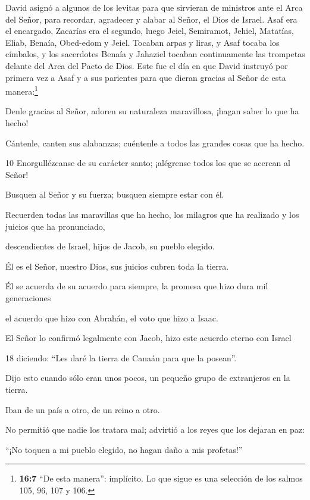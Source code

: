  David asignó a algunos de los levitas para que sirvieran de
ministros ante el Arca del Señor, para recordar, agradecer y alabar al
Señor, el Dios de Israel.  Asaf era el encargado, Zacarías
era el segundo, luego Jeiel, Semiramot, Jehiel, Matatías, Eliab, Benaía,
Obed-edom y Jeiel. Tocaban arpas y liras, y Asaf tocaba los címbalos,
 y los sacerdotes Benaía y Jahaziel tocaban continuamente
las trompetas delante del Arca del Pacto de Dios.  Este fue
el día en que David instruyó por primera vez a Asaf y a sus parientes
para que dieran gracias al Señor de esta manera:\footnote{\textbf{16:7}
  ``De esta manera'': implícito. Lo que sigue es una selección de los
  salmos 105, 96, 107 y 106.}

 Denle gracias al Señor, adoren su naturaleza maravillosa,
¡hagan saber lo que ha hecho!

 Cántenle, canten sus alabanzas; cuéntenle a todos las
grandes cosas que ha hecho.

10 Enorgullézcanse de su carácter santo; ¡alégrense todos los que se
acercan al Señor!

 Busquen al Señor y su fuerza; busquen siempre estar con
él.

 Recuerden todas las maravillas que ha hecho, los milagros
que ha realizado y los juicios que ha pronunciado,

 descendientes de Israel, hijos de Jacob, su pueblo
elegido.

 Él es el Señor, nuestro Dios, sus juicios cubren toda la
tierra.

 Él se acuerda de su acuerdo para siempre, la promesa que
hizo dura mil generaciones

 el acuerdo que hizo con Abrahán, el voto que hizo a Isaac.

 El Señor lo confirmó legalmente con Jacob, hizo este
acuerdo eterno con Israel

18 diciendo: ``Les daré la tierra de Canaán para que la posean''.

 Dijo esto cuando sólo eran unos pocos, un pequeño grupo de
extranjeros en la tierra.

 Iban de un país a otro, de un reino a otro.

 No permitió que nadie los tratara mal; advirtió a los
reyes que los dejaran en paz:

 ``¡No toquen a mi pueblo elegido, no hagan daño a mis
profetas!''

